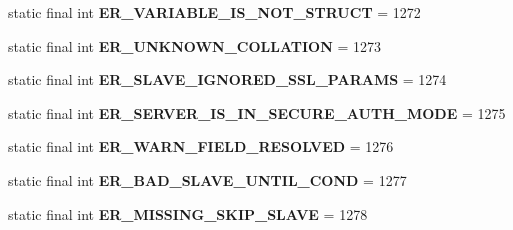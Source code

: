 \begin{DoxyCompactItemize}
\item 
\mbox{\label{classcom_1_1mysql_1_1cj_1_1exceptions_1_1_mysql_error_numbers_a2839e0d2040cf99fb6c463ab004d8879}} 
static final int {\bfseries E\+R\+\_\+\+V\+A\+R\+I\+A\+B\+L\+E\+\_\+\+I\+S\+\_\+\+N\+O\+T\+\_\+\+S\+T\+R\+U\+CT} = 1272
\item 
\mbox{\label{classcom_1_1mysql_1_1cj_1_1exceptions_1_1_mysql_error_numbers_a587b6e1fe9c445250bb293d4bb013335}} 
static final int {\bfseries E\+R\+\_\+\+U\+N\+K\+N\+O\+W\+N\+\_\+\+C\+O\+L\+L\+A\+T\+I\+ON} = 1273
\item 
\mbox{\label{classcom_1_1mysql_1_1cj_1_1exceptions_1_1_mysql_error_numbers_af7a6f0586126dc53071b9205cd36117e}} 
static final int {\bfseries E\+R\+\_\+\+S\+L\+A\+V\+E\+\_\+\+I\+G\+N\+O\+R\+E\+D\+\_\+\+S\+S\+L\+\_\+\+P\+A\+R\+A\+MS} = 1274
\item 
\mbox{\label{classcom_1_1mysql_1_1cj_1_1exceptions_1_1_mysql_error_numbers_a13e2dfe590a4d7191d3149c69dd97317}} 
static final int {\bfseries E\+R\+\_\+\+S\+E\+R\+V\+E\+R\+\_\+\+I\+S\+\_\+\+I\+N\+\_\+\+S\+E\+C\+U\+R\+E\+\_\+\+A\+U\+T\+H\+\_\+\+M\+O\+DE} = 1275
\item 
\mbox{\label{classcom_1_1mysql_1_1cj_1_1exceptions_1_1_mysql_error_numbers_a62f2a7c5839caafd410cd2e30c473f88}} 
static final int {\bfseries E\+R\+\_\+\+W\+A\+R\+N\+\_\+\+F\+I\+E\+L\+D\+\_\+\+R\+E\+S\+O\+L\+V\+ED} = 1276
\item 
\mbox{\label{classcom_1_1mysql_1_1cj_1_1exceptions_1_1_mysql_error_numbers_a67c739adaa69e7b9a76fc287c93d5f93}} 
static final int {\bfseries E\+R\+\_\+\+B\+A\+D\+\_\+\+S\+L\+A\+V\+E\+\_\+\+U\+N\+T\+I\+L\+\_\+\+C\+O\+ND} = 1277
\item 
\mbox{\label{classcom_1_1mysql_1_1cj_1_1exceptions_1_1_mysql_error_numbers_a7addc561ac55a3dcb055cabec6296889}} 
static final int {\bfseries E\+R\+\_\+\+M\+I\+S\+S\+I\+N\+G\+\_\+\+S\+K\+I\+P\+\_\+\+S\+L\+A\+VE} = 1278

\end{DoxyCompactItemize}
